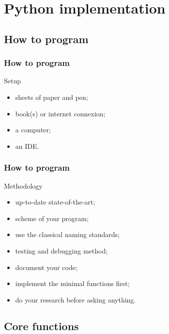 \documentclass[compress, english, aspectratio=169]{beamer}
\begin{document}
\section{Python implementation}
\subsection{How to program}
\begin{frame}
\frametitle{How to program}
\begin{block}{Setup}
\begin{itemize}
\item sheets of paper and pen;
\item book(s) or internet connexion;
\item a computer;
\item an IDE.
\end{itemize}
\end{block}
\end{frame}

\begin{frame}
\frametitle{How to program}
\begin{block}{Methodology}
\begin{itemize}
\item up-to-date state-of-the-art;
\item scheme of your program;
\item use the classical naming standards;
\item testing and debugging method;
\item document your code;
\item implement the minimal functions first;
\item do your research before asking anything.
\end{itemize}
\end{block}
\end{frame}



\subsection{Core functions}
\end{document}
